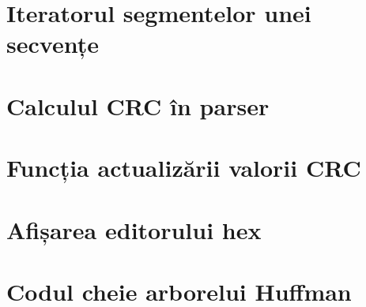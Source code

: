 \documentclass[a4paper,12pt]{report}
\begin{document}
\section{Iteratorul segmentelor unei secvențe}\label{appendix:sequence_iterator}

\section{Calculul CRC în parser}\label{appendix:crc_sequence_defer_example}

\section{Funcția actualizării valorii CRC}\label{appendix:crc}

\section{Afișarea editorului hex}\label{appendix:draw_hex_grid}

\section{Codul cheie arborelui Huffman}\label{appendix:huffman_tree}



\end{document}
